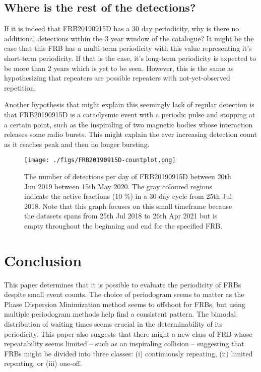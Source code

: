 \documentclass[reprint,amsmath,amssymb,showkeys,prd]{revtex4-2}
\begin{document}
\subsection{Where is the rest of the detections?}\label{sec-why-30}

If it is indeed that FRB20190915D has a 30 day periodicity, why is there no additional detections within the 3 year window of the catalogue?
It might be the case that this FRB has a multi-term periodicity with this value representing it's short-term periodicity.
If that is the case, it's long-term periodicity is expected to be more than 2 years which is yet to be seen.
However, this is the same as hypothesizing that repeaters are possible repeaters with not-yet-observed repetition.

Another hypothesis that might explain this seemingly lack of regular detection is that FRB20190915D is a cataclysmic event with a periodic pulse and stopping at a certain point, such as the inspiraling of two magnetic bodies whose interaction releases some radio bursts.
This might explain the ever increasing detection count as it reaches peak and then no longer bursting.

\begin{figure}[ht]
    \label{fig-FRB20190915D-countplot}
    \caption{The number of detections per day of FRB20190915D between 20th Jun 2019 between 15th May 2020. The gray coloured regions indicate the active fractions (10 \%) in a 30 day cycle from 25th Jul 2018. Note that this graph focuses on this small timeframe because the datasets spans from 25th Jul 2018 to 26th Apr 2021 but is empty throughout the beginning and end for the specified FRB.}
    \centering
    \texttt{[image: ./figs/FRB20190915D-countplot.png]}
\end{figure}

\section{Conclusion}

This paper determines that it is possible to evaluate the periodicity of FRBs despite small event counts.
The choice of periodogram seems to matter as the Phase Dispersion Minimization method seems to offshoot for FRBs, but using multiple periodogram methods help find a consistent pattern. 
The bimodal distribution of waiting times seems crucial in the determinability of its periodicity.
This paper also suggests that there might a new class of FRB whose repeatability seems limited -- such as an inspiraling collision -- suggesting that FRBs might be divided into three classes: (i) continuously repeating, (ii) limited repeating, or (iii) one-off.
\end{document}
